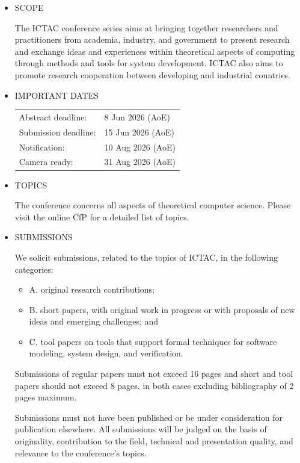 \documentclass[prodmode,acmtecs]{acmsmall} %
\begin{document}
\begin{itemize}\item  SCOPE 
 
  The ICTAC conference series aims at bringing together researchers and practitioners from academia, industry, and government to present research and exchange ideas and experiences within theoretical  aspects of computing through methods and tools for system development.  ICTAC also aims to promote research cooperation between developing and industrial countries. 
 
\item  IMPORTANT DATES 
 
\begin{tabulary}{\linewidth}{LL}Abstract deadline:  & 8 Jun 2026 (AoE) \\
Submission deadline:  & 15 Jun 2026 (AoE) \\
Notification:  & 10 Aug 2026 (AoE) \\
Camera ready:  & 31 Aug 2026 (AoE) \\
\end{tabulary}
 
\item  TOPICS 
 
  The conference concerns all aspects of theoretical computer science. Please visit the online CfP for a detailed list of topics.  
 
\item  SUBMISSIONS 
 
  We solicit submissions, related to the topics of ICTAC, in the following categories: 
 
\begin{itemize}\item  A. original research contributions;
\item  B. short papers, with original work in progress or with proposals of new ideas and emerging challenges; and
\item  C. tool papers on tools that support formal techniques for software modeling, system design, and verification.
\end{itemize} 
  Submissions of regular papers must not exceed 16 pages and short and tool papers should not exceed 8 pages, in both cases excluding bibliography of 2 pages maximum. 
 
  Submissions must not have been published or be under consideration for publication elsewhere. All submissions will be judged on the basis of originality, contribution to the field, technical and presentation quality, and relevance to the conference’s topics. 
 

\end{itemize}
\end{document}
